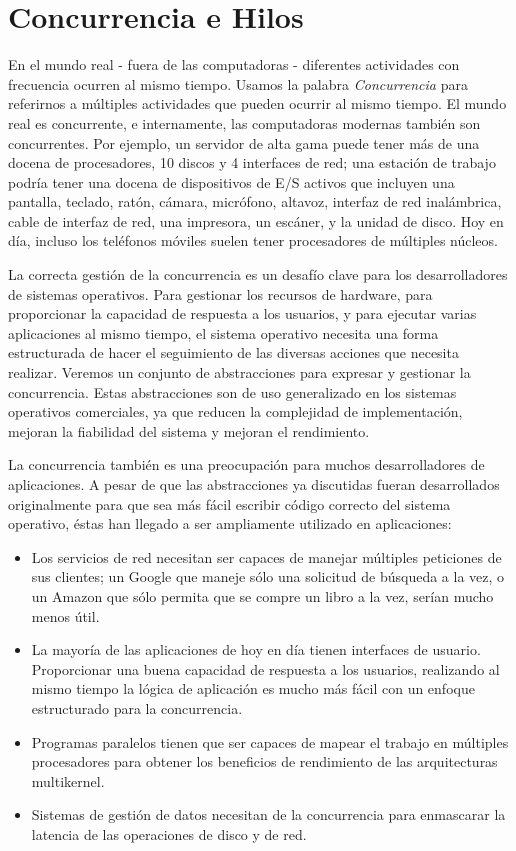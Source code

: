 \documentclass[10pt]{book}
\begin{document}
\chapter{Concurrencia e Hilos}
En el mundo real - fuera de las computadoras - diferentes actividades con frecuencia ocurren al mismo tiempo. Usamos la palabra \textit{Concurrencia} para referirnos a múltiples actividades que pueden ocurrir al mismo tiempo. El mundo real es concurrente, e internamente, las computadoras modernas también son concurrentes. Por ejemplo, un servidor de alta gama puede tener más de una docena de procesadores, 10 discos y 4 interfaces de red; una estación de trabajo podría tener una docena de dispositivos de E/S activos que incluyen una pantalla, teclado, ratón, cámara, micrófono, altavoz, interfaz de red inalámbrica, cable de interfaz de red, una impresora, un escáner, y la unidad de disco. Hoy en día, incluso los teléfonos móviles suelen tener procesadores de múltiples núcleos.

La correcta gestión de la concurrencia es un desafío clave para los desarrolladores de sistemas operativos. Para gestionar los recursos de hardware, para proporcionar la capacidad de respuesta a los usuarios, y para ejecutar varias aplicaciones al mismo tiempo, el sistema operativo necesita una forma estructurada de hacer el seguimiento de las diversas acciones que necesita realizar. Veremos un conjunto de abstracciones para expresar y gestionar la concurrencia. Estas abstracciones son de uso generalizado en los sistemas operativos comerciales, ya que reducen la complejidad de implementación, mejoran la fiabilidad del sistema y mejoran el rendimiento.

La concurrencia también es una preocupación para muchos desarrolladores de aplicaciones. A pesar de que las abstracciones ya discutidas fueran desarrollados originalmente para que sea más fácil escribir código correcto del sistema operativo, éstas han llegado a ser ampliamente utilizado en aplicaciones:
\begin{itemize}
\item Los servicios de red necesitan ser capaces de manejar múltiples peticiones de sus clientes; un Google que maneje sólo una solicitud de búsqueda a la vez, o un Amazon que sólo permita que se compre un libro a la vez, serían mucho menos útil.
\item La mayoría de las aplicaciones de hoy en día tienen interfaces de usuario. Proporcionar una buena capacidad de respuesta a los usuarios, realizando al mismo tiempo la lógica de aplicación es mucho más fácil con un enfoque estructurado para la concurrencia.
\item Programas paralelos tienen que ser capaces de mapear el trabajo en múltiples procesadores para obtener los beneficios de rendimiento de las arquitecturas multikernel.
\item Sistemas de gestión de datos necesitan de la concurrencia para enmascarar la latencia de las operaciones de disco y de red.
\end{itemize}
\end{document}
